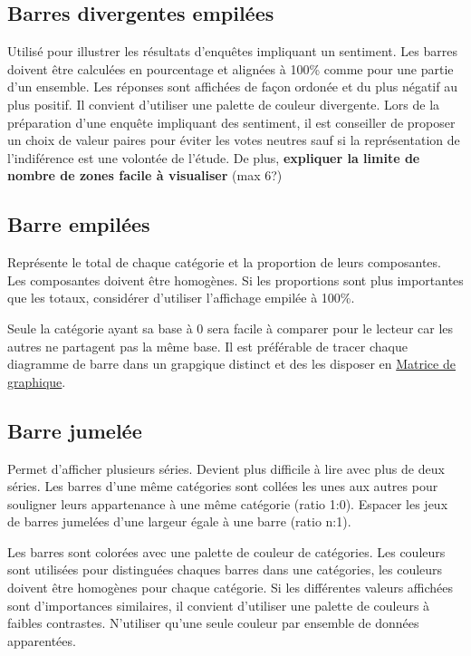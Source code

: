 \documentclass[a4paper,12pt]{article}
\begin{document}
\begin{multicols}{2}
\subsection*{Barres divergentes empilées}
\label{sec:org3dc93d6}
Utilisé pour illustrer les résultats d'enquêtes impliquant un sentiment. \autocite{alansmithLexiqueVisuel} Les barres doivent être calculées en pourcentage et alignées à 100\% comme pour une partie d'un ensemble. Les réponses sont affichées de façon ordonée et du plus négatif au plus positif. Il convient d'utiliser une palette de couleur divergente. Lors de la préparation d'une enquête impliquant des sentiment, il est conseiller de proposer un choix de valeur paires pour éviter les votes neutres sauf si la représentation de l'indiférence est une volontée de l'étude. De plus, \textbf{expliquer la limite de nombre de zones facile à visualiser} (max 6?)
\subsection*{Barre empilées}
\label{sec:orgdd09c6b}
Représente le total de chaque catégorie et la proportion de leurs composantes. Les composantes doivent être homogènes. Si les proportions sont plus importantes que les totaux, considérer d'utiliser l'affichage empilée à 100\%. \autocite{mikeyiHowChooseRight2020}

Seule la catégorie ayant sa base à 0 sera facile à comparer pour le lecteur car les autres ne partagent pas la même base.\autocite{jonathanschwabishComparingCategories2021} Il est préférable de tracer chaque diagramme de barre dans un grapgique distinct et des les disposer en \hyperref[sec:org9f8620b]{Matrice de graphique}. \autocite{jonathanschwabishComparingCategories2021}
\subsection*{Barre jumelée}
\label{sec:orgec52f13}
Permet d'afficher plusieurs séries. Devient plus difficile à lire avec plus de deux séries. \autocite{alansmithLexiqueVisuel}
Les barres d'une même catégories sont collées les unes aux autres pour souligner leurs appartenance à une même catégorie (ratio 1:0). Espacer les jeux de barres jumelées d'une largeur égale à une barre (ratio n:1).

Les barres sont colorées avec une palette de couleur de catégories. Les couleurs sont utilisées pour distinguées chaques barres dans une catégories, les couleurs doivent être homogènes pour chaque catégorie. Si les différentes valeurs affichées sont d'importances similaires, il convient d'utiliser une palette de couleurs à faibles contrastes. N'utiliser qu'une seule couleur par ensemble de données apparentées. \autocite{stephenfewComponentlevelGraphDesign2012}

\end{multicols}
\end{document}
